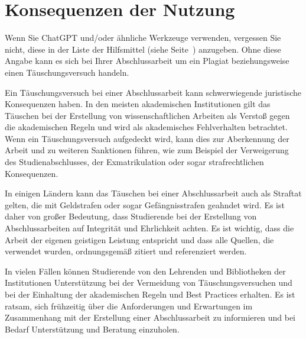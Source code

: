 
\section{Konsequenzen der Nutzung}\label{apdx:sect:Consequences}
Wenn Sie ChatGPT und/oder ähnliche Werkzeuge verwenden, vergessen Sie nicht, diese in der Liste der Hilfsmittel (siehe Seite~\pageref{Tools}) anzugeben. Ohne diese Angabe kann es sich bei Ihrer Abschlussarbeit um ein Plagiat beziehungsweise einen Täuschungsversuch handeln.


Ein Täuschungsversuch bei einer Abschlussarbeit kann schwerwiegende juristische Konsequenzen haben. In den meisten akademischen Institutionen gilt das Täuschen bei der Erstellung von wissenschaftlichen Arbeiten als Verstoß gegen die akademischen Regeln und wird als akademisches Fehlverhalten betrachtet. Wenn ein Täuschungsversuch aufgedeckt wird, kann dies zur Aberkennung der Arbeit und zu weiteren Sanktionen führen, wie zum Beispiel der Verweigerung des Studienabschlusses, der Exmatrikulation oder sogar strafrechtlichen Konsequenzen.

In einigen Ländern kann das Täuschen bei einer Abschlussarbeit auch als Straftat gelten, die mit Geldstrafen oder sogar Gefängnisstrafen geahndet wird. Es ist daher von großer Bedeutung, dass Studierende bei der Erstellung von Abschlussarbeiten auf Integrität und Ehrlichkeit achten. Es ist wichtig, dass die Arbeit der eigenen geistigen Leistung entspricht und dass alle Quellen, die verwendet wurden, ordnungsgemäß zitiert und referenziert werden.

In vielen Fällen können Studierende von den Lehrenden und Bibliotheken der Institutionen Unterstützung bei der Vermeidung von Täuschungsversuchen und bei der Einhaltung der akademischen Regeln und Best Practices erhalten. Es ist ratsam, sich frühzeitig über die Anforderungen und Erwartungen im Zusammenhang mit der Erstellung einer Abschlussarbeit zu informieren und bei Bedarf Unterstützung und Beratung einzuholen.



